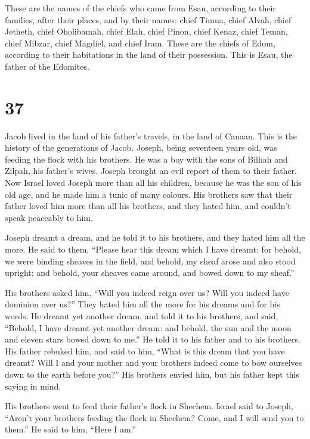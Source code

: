  These are the names of the chiefs who came from Esau,
according to their families, after their places, and by their names:
chief Timna, chief Alvah, chief Jetheth,  chief Oholibamah,
chief Elah, chief Pinon,  chief Kenaz, chief Teman, chief
Mibzar,  chief Magdiel, and chief Iram. These are the
chiefs of Edom, according to their habitations in the land of their
possession. This is Esau, the father of the Edomites.

\hypertarget{section-36}{%
\section{37}\label{section-36}}

 Jacob lived in the land of his father's travels, in the
land of Canaan.  This is the history of the generations of
Jacob. Joseph, being seventeen years old, was feeding the flock with his
brothers. He was a boy with the sons of Bilhah and Zilpah, his father's
wives. Joseph brought an evil report of them to their father.
 Now Israel loved Joseph more than all his children, because
he was the son of his old age, and he made him a tunic of many colours.
 His brothers saw that their father loved him more than all
his brothers, and they hated him, and couldn't speak peaceably to him.

 Joseph dreamt a dream, and he told it to his brothers, and
they hated him all the more.  He said to them, ``Please hear
this dream which I have dreamt:  for behold, we were binding
sheaves in the field, and behold, my sheaf arose and also stood upright;
and behold, your sheaves came around, and bowed down to my sheaf.''

 His brothers asked him, ``Will you indeed reign over us?
Will you indeed have dominion over us?'' They hated him all the more for
his dreams and for his words.  He dreamt yet another dream,
and told it to his brothers, and said, ``Behold, I have dreamt yet
another dream: and behold, the sun and the moon and eleven stars bowed
down to me.''  He told it to his father and to his
brothers. His father rebuked him, and said to him, ``What is this dream
that you have dreamt? Will I and your mother and your brothers indeed
come to bow ourselves down to the earth before you?''  His
brothers envied him, but his father kept this saying in mind.

 His brothers went to feed their father's flock in Shechem.
 Israel said to Joseph, ``Aren't your brothers feeding the
flock in Shechem? Come, and I will send you to them.'' He said to him,
``Here I am.''

